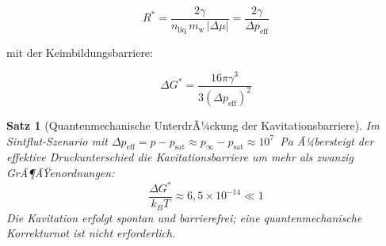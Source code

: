 ﻿\documentclass[12pt,a4paper]{report}
\newtheorem{theorem}{Satz}[chapter]
\begin{document}
\begin{equation}
	R^* = \frac{2\gamma}{n_\mathrm{liq}\,m_\mathrm{w}\,|\Delta\mu|} = \frac{2\gamma}{\Delta p_\mathrm{eff}}
	\label{eq:kritischer_radius}
\end{equation}

mit der Keimbildungsbarriere:

\begin{equation}
	\Delta G^* = \frac{16\pi\gamma^3}{3(\Delta p_\mathrm{eff})^2}
	\label{eq:keimbarriere}
	\end{equation}
		
\begin{theorem}[Quantenmechanische UnterdrÃ¼ckung der Kavitationsbarriere]
	\label{thm:kavitation_quanten}
	Im Sintflut-Szenario mit $\Delta p_\mathrm{eff} = p - p_\mathrm{sat} \approx p_\infty - p_\mathrm{sat} \approx 10^7$~Pa Ã¼bersteigt der effektive Druckunterschied die Kavitationsbarriere um mehr als zwanzig GrÃ¶ÃŸenordnungen:
	\begin{equation}
		\frac{\Delta G^*}{k_BT} \approx 6{,}5\times10^{-14} \ll 1
		\label{eq:barrierebreite}
	\end{equation}
	Die Kavitation erfolgt spontan und barrierefrei; eine quantenmechanische Korrekturnot ist nicht erforderlich.
\end{theorem}
\end{document}
